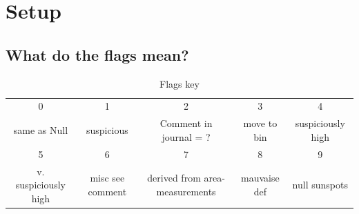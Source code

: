\documentclass[12pt]{article}
\begin{document}
\section{Setup}

\subsection{What do the flags mean?}\label{flags section}
\newpage%
\begin{table}[H]
    \centering
    \begin{tabular}{c|c|c|c|c}
        0 & 1 & 2 & 3 & 4 \\
        same as Null & suspicious & Comment in journal = ? & move to bin & suspiciously high\\
        \hline
        5 & 6 & 7 & 8 & 9\\
        v. suspiciously high & misc see comment & derived from area-measurements & mauvaise def & null sunspots
         
    \end{tabular}
    \caption{Flags key}
    \label{tab:flag}
\end{table}
\end{document}
